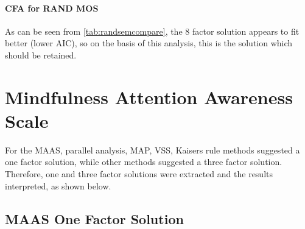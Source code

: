 \documentclass{article}
\begin{document}
\paragraph{CFA for RAND MOS}







\begin{table}[ht]
\centering
{}
\caption{SEM Comparison for RAND MOS Factor Solutions, Sample One} 
\label{tab:randsemcompare}
\end{table}
As can be seen from \ref{tab:randsemcompare}, the 8 factor solution appears to fit better (lower AIC), so on the basis of this analysis, this is the solution which should be retained.

\section{Mindfulness Attention Awareness Scale}

For the MAAS, parallel analysis, MAP, VSS, Kaisers rule methods suggested a one factor solution, while other methods suggested a three factor solution. Therefore, one and three factor solutions were extracted and the results interpreted, as shown below.

\subsection{MAAS One Factor Solution}
\label{sec:maas-one-factor}
\end{document}
